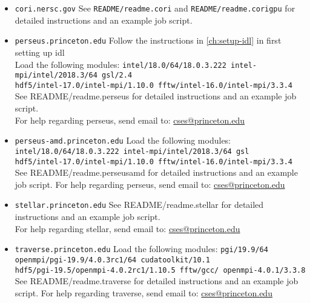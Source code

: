 \begin{itemize}
\item{\texttt{cori.nersc.gov}}
\newline\newline
See \texttt{README/readme.cori} and \texttt{README/readme.corigpu} for detailed instructions and an example job script.

\item{\texttt{perseus.princeton.edu}}
\newline\newline
Follow the instructions in \ref{ch:setup-idl} in first setting up idl 
\\
Load the following modules:
\newline\newline
\texttt{intel/18.0/64/18.0.3.222 intel-mpi/intel/2018.3/64 gsl/2.4
\\
hdf5/intel-17.0/intel-mpi/1.10.0	fftw/intel-16.0/intel-mpi/3.3.4
}
\newline\newline
See README/readme.perseus for detailed instructions and an example job script.
\\
For help regarding perseus, send email to: \href{mailto:cses@princeton.edu}{cses@princeton.edu}
\item{\texttt{perseus-amd.princeton.edu}}
\newline\newline
Load the following modules:
\newline\newline
\texttt{
intel/18.0/64/18.0.3.222 intel-mpi/intel/2018.3/64 gsl
\\
hdf5/intel-17.0/intel-mpi/1.10.0	fftw/intel-16.0/intel-mpi/3.3.4
}\\
See README/readme.perseusamd for detailed instructions and an example job script.
\newline\newline
For help regarding perseus, send email to: \href{mailto:cses@princeton.edu}{cses@princeton.edu}

\item{\texttt{stellar.princeton.edu}}
\newline\newline
See README/readme.stellar for detailed instructions and an example job script.
\\
For help regarding stellar, send email to: \href{mailto:cses@princeton.edu}{cses@princeton.edu}

\item{\texttt{traverse.princeton.edu}}
\newline\newline
Load the following modules:
\newline\newline
\texttt{pgi/19.9/64 openmpi/pgi-19.9/4.0.3rc1/64 cudatoolkit/10.1
\\
hdf5/pgi-19.5/openmpi-4.0.2rc1/1.10.5 fftw/gcc/ openmpi-4.0.1/3.3.8
}\\
See README/readme.traverse for detailed instructions and an example job script.
\newline\newline
For help regarding traverse, send email to: \href{mailto:cses@princeton.edu}{cses@princeton.edu}
\end{itemize}

